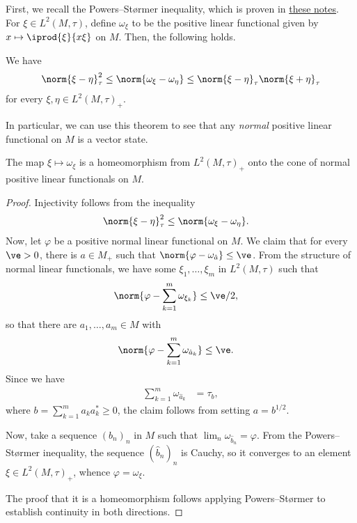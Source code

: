 \documentclass[10pt]{mypackage}
\begin{document}
First, we recall the Powers--Størmer inequality, which is proven in \href{https://ai-bearing.github.io/Classes_and_Homework/After\%20College/Other\%20Notes/injective_implies_hyperfinite.pdf}{these notes}. For $\xi\in L^2\left( M,\tau \right)$, define $\omega_{\xi}$ to be the positive linear functional given by $ x\mapsto \iprod{\xi}{x\xi} $ on $M$. Then, the following holds.
\begin{theorem}
  We have
  \begin{align*}
    \norm{\xi-\eta}_{\tau}^2 \leq \norm{\omega_{\xi}-\omega_{\eta}}\leq \norm{\xi-\eta}_{\tau}\norm{\xi + \eta}_{\tau}
  \end{align*}
  for every $\xi,\eta\in L^{2}\left( M,\tau \right)_{+}$.
\end{theorem}
In particular, we can use this theorem to see that any \textit{normal} positive linear functional on $M$ is a vector state.
\begin{theorem}
  The map $\xi\mapsto \omega_{\xi}$ is a homeomorphism from $L^2\left( M,\tau \right)_{+}$ onto the cone of normal positive linear functionals on $M$.
\end{theorem}
\begin{proof}
  Injectivity follows from the inequality
  \begin{align*}
    \norm{\xi-\eta}_{\tau}^2 &\leq \norm{\omega_{\xi}-\omega_{\eta}}.
  \end{align*}
  Now, let $\varphi$ be a positive normal linear functional on $M$. We claim that for every $\ve > 0$, there is $a\in M_{+}$ such that $\norm{\varphi-\omega_{\hat{a}}}\leq \ve$. From the structure of normal linear functionals, we have some $\xi_1,\dots,\xi_m$ in $L^2\left( M,\tau \right)$ such that
  \begin{align*}
    \norm{\varphi-\sum_{k=1}^{m}\omega_{\xi_k}} &\leq \ve/2,
  \end{align*}
  so that there are $a_1,\dots,a_m\in M$ with
  \begin{align*}
    \norm{\varphi-\sum_{k=1}^{m}\omega_{\hat{a}_k}} &\leq \ve.
  \end{align*}
  Since we have
  \begin{align*}
    \sum_{k=1}^{m}\omega_{\hat{a}_k} &= \tau_b,
  \end{align*}
  where $b = \sum_{k=1}^{m}a_ka_k^{\ast}\geq 0$, the claim follows from setting $a = b^{1/2}$.

  Now, take a sequence $\left( b_n \right)_n$ in $M$ such that $\lim_{n}\omega_{\hat{b}_n} = \varphi$. From the Powers--Størmer inequality, the sequence $\left( \hat{b}_n \right)_n$ is Cauchy, so it converges to an element $\xi\in L^2\left( M,\tau \right)_{+}$, whence $\varphi = \omega_{\xi}$.

  The proof that it is a homeomorphism follows applying Powers--Størmer to establish continuity in both directions.
\end{proof}
\end{document}
